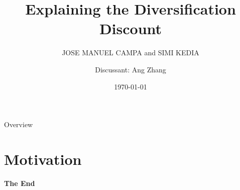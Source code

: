 \documentclass[aspectratio=169,xcolor=dvipsnames]{beamer}
\title{Explaining the Diversification Discount}
\subtitle{JOSE MANUEL CAMPA and SIMI KEDIA}
\author{Discussant: Ang Zhang}
\date{\today} %
\begin{document}
\begin{frame}
    \titlepage
\end{frame}

\begin{frame}{Overview}
    \tableofcontents
\end{frame}

\section{Motivation}

\begin{frame}
    \Huge{\centerline{\textbf{The End}}}
\end{frame}
\end{document}
